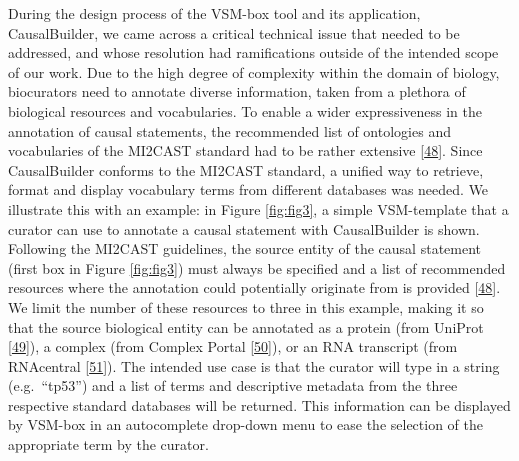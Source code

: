 \documentclass[
  12pt,
]{book}
\begin{document}
\indent

During the design process of the VSM-box tool and its application, CausalBuilder, we came across a critical technical issue that needed to be addressed, and whose resolution had ramifications outside of the intended scope of our work.
Due to the high degree of complexity within the domain of biology, biocurators need to annotate diverse information, taken from a plethora of biological resources and vocabularies.
To enable a wider expressiveness in the annotation of causal statements, the recommended list of ontologies and vocabularies of the MI2CAST standard had to be rather extensive {[}\protect\hyperlink{ref-mi2cast-doc}{48}{]}.
Since CausalBuilder conforms to the MI2CAST standard, a unified way to retrieve, format and display vocabulary terms from different databases was needed.
We illustrate this with an example: in Figure \ref{fig:fig3}, a simple VSM-template that a curator can use to annotate a causal statement with CausalBuilder is shown.
Following the MI2CAST guidelines, the source entity of the causal statement (first box in Figure \ref{fig:fig3}) must always be specified and a list of recommended resources where the annotation could potentially originate from is provided {[}\protect\hyperlink{ref-mi2cast-doc}{48}{]}.
We limit the number of these resources to three in this example, making it so that the source biological entity can be annotated as a protein (from UniProt {[}\protect\hyperlink{ref-TheUniProtConsortium2019}{49}{]}), a complex (from Complex Portal {[}\protect\hyperlink{ref-Meldal2019}{50}{]}), or an RNA transcript (from RNAcentral {[}\protect\hyperlink{ref-RNACentral2018}{51}{]}).
The intended use case is that the curator will type in a string (e.g.~``tp53'') and a list of terms and descriptive metadata from the three respective standard databases will be returned.
This information can be displayed by VSM-box in an autocomplete drop-down menu to ease the selection of the appropriate term by the curator.
\end{document}

